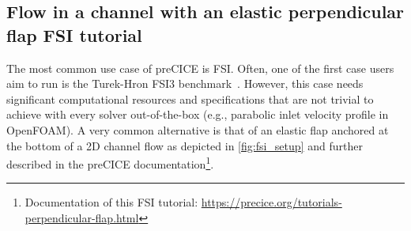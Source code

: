 \subsection{Flow in a channel with an elastic perpendicular flap FSI tutorial} 

The most common use case of preCICE is FSI.
Often, one of the first case users aim to run is the Turek-Hron FSI3 benchmark~\cite{turek2006proposal}.
However, this case needs significant computational resources and specifications that are
not trivial to achieve with every solver out-of-the-box (e.g., parabolic inlet velocity profile in OpenFOAM).
A very common alternative is that of an elastic flap anchored at the bottom of a 2D channel flow as depicted in \autoref{fig:fsi_setup} and further described in the preCICE documentation\footnote{Documentation of this FSI tutorial: \url{https://precice.org/tutorials-perpendicular-flap.html}}.

